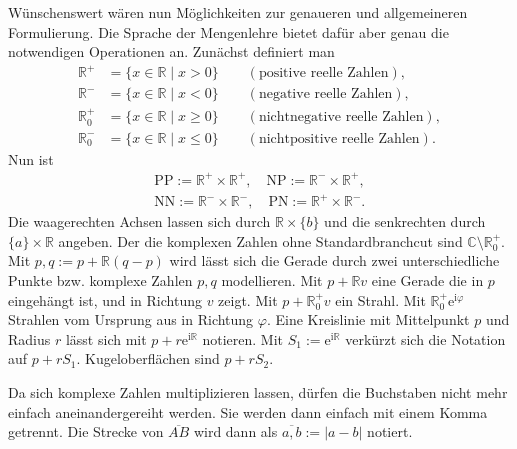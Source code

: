 \documentclass[a4paper,11pt,fleqn]{article}
\newcommand{\R}{\mathbb R}
\newcommand{\C}{\mathbb C}
\newcommand{\ee}{\mathrm e}
\newcommand{\ui}{\mathrm i}
\begin{document}
Wünschenswert wären nun Möglichkeiten zur genaueren und allgemeineren
Formulierung. Die Sprache der Mengenlehre bietet dafür aber genau
die notwendigen Operationen an. Zunächst definiert man
\begin{align}
\R^+ &= \{x\in\R\mid x>0\}\qquad(\text{positive reelle Zahlen}),\\
\R^- &= \{x\in\R\mid x<0\}\qquad(\text{negative reelle Zahlen}),\\
\R_0^+ &= \{x\in\R\mid x\ge 0\}\qquad(\text{nichtnegative reelle Zahlen}),\\
\R_0^- &= \{x\in\R\mid x\le 0\}\qquad(\text{nichtpositive reelle Zahlen}).
\end{align}
Nun ist
\begin{equation}
\begin{split}
\mathrm{PP}:=\R^+\times\R^+,\quad\mathrm{NP}:=\R^-\times\R^+,\\
\mathrm{NN}:=\R^-\times\R^-,\quad\mathrm{PN}:=\R^+\times\R^-.
\end{split}
\end{equation}
Die waagerechten Achsen lassen sich durch $\R\times\{b\}$
und die senkrechten durch $\{a\}\times\R$ angeben.
Der die komplexen Zahlen ohne Standardbranchcut sind
$\C\setminus\R_0^+$. Mit $p,q:=p+\R(q-p)$ wird lässt sich die Gerade durch
zwei unterschiedliche Punkte bzw. komplexe Zahlen $p,q$ modellieren.
Mit $p+\R v$ eine Gerade die in $p$ eingehängt ist, und in
Richtung $v$ zeigt. Mit $p+\R_0^+v$ ein Strahl.
Mit $\R_0^+\ee^{\ui\varphi}$ Strahlen vom
Ursprung aus in Richtung $\varphi$. Eine Kreislinie mit Mittelpunkt
$p$ und Radius $r$ lässt sich mit $p+r\ee^{\ui\R}$ notieren.
Mit $S_1:=\ee^{\ui\R}$ verkürzt sich die Notation auf $p+rS_1$.
Kugeloberflächen sind $p+rS_2$.

Da sich komplexe Zahlen multiplizieren lassen, dürfen die
Buchstaben nicht mehr einfach aneinandergereiht werden.
Sie werden dann einfach mit einem Komma getrennt.
Die Strecke von $\overline{AB}$ wird dann als $\overline{a,b}:=|a-b|$
notiert.
\end{document}
